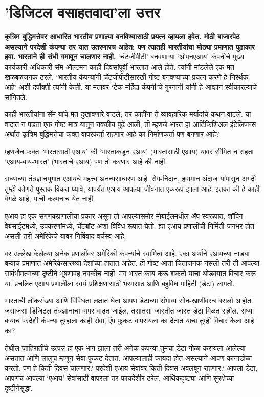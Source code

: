 \chapter{'डिजिटल वसाहतवादा'ला उत्तर }

{\textbf{कृत्रिम बुद्धिमत्तेवर आधारित भारतीय प्रणाल्या बनविण्यासाठी प्रयत्न व्हायला हवेत. मोठी बाजारपेठ असल्याने परदेशी कंपन्या तर यात उतरणारच आहेत; पण त्यातही भारतीयांचा मोठ्या प्रमाणात पुढाकार हवा. भारताने ही संधी गमावून चालणार नाही.}}
‘चॅटजीपीटी’ बनवणाऱ्या ‘ओपनएआय’ कंपनीचे मुख्य कार्यकारी अधिकारी सॅम ऑल्टमन काही दिवसांपूर्वी भारतात आले होते. त्यांनी मांडलेले एक मत खळबळजनक ठरले. ‘भारतीय कंपन्यांनी चॅटजीपीटीसारखी गोष्ट बनवण्याच्या प्रयत्न करणे हे निरर्थक आहे’ अशी दर्पोक्ती त्यांनी केली. या मतावर ‘टेक महिंद्रा कंपनी’चे गुरनानी यांनी हे आव्हान स्वीकारल्याचे सांगितले.

काही भारतीयांना सॅम यांचे मत दुखावणारे वाटले; तर काहींना ते व्यावहारिक मर्यादांचे कथन वाटले. या वादात न पडता एक गोष्ट मात्र यातून नक्कीच पुढे आली, ती म्हणजे भारत हा आर्टिफिशिअल इंटेलिजन्स अर्थात कृत्रिम बुद्धिमत्तेचा फक्त वापरकर्ता राहणार आहे का निर्माणकर्ता पण बनणार आहे?

म्हणजेच फक्त ‘भारतासाठी एआय’ की ‘भारताकडून एआय’ (भारतासाठी एआय) यावर सीमित न राहता ‘एआय-बाय-भारत’ (भारताचे एआय) पण तो करणार आहे की नाही.

सध्याच्या तंत्रज्ञानयुगात एआयचे महत्त्व अनन्यसाधारण आहे. रोग-निदान, हवामान अंदाज यांपासून अगदी तुम्ही कोणते पुस्तक विकत घ्यावे, यापर्यंत एआय आपल्या जीवनात एकरूप झाला आहे. इतका की हे काही वेगळे आहे, याची कल्पनाच येत नाही.

एआय हा एक संगणकप्रणालीचा प्रकार असून तो आपल्यासमोर मोबाईलमधील ॲप स्वरूपात, शॉपिंग वेबसाईटमध्ये, उपकरणांमध्ये, चॅटबॉट अशा विविध रूपात येतो. ह्या एआय प्रणालींची निर्मिती जगभर होत असली तरी अमेरिकेचे यावर निर्विवाद वर्चस्व आहे.

वर उल्लेख केलेल्या अनेक प्रणालींवर अमेरिकी कंपन्यांचे स्वामित्व आहे. एका अर्थाने एआयच्या नाड्या बऱ्याच प्रमाणात अमेरिकेसारख्या देशांच्या हातात आहेत. ही गोष्ट आता चिंताजनक नसली तरी ती आपल्या सार्वभौमत्वाच्या दृष्टीने भूषणावह नक्कीच नाही. मग भारत काय करू शकतो याचा थोडक्यात विचार करू या. प्रचलित एआय प्रणालीला स्वयं प्रशिक्षणासाठी भरमसाठ आणि बहुविध माहिती (डेटा) लागतो.

भारताची लोकसंख्या आणि विविधता लक्षात घेता आपण डेटाच्या संभाव्य सोन-खाणीवरच बसलो आहोत. जसाजसा डिजिटल तंत्रज्ञानाचा वापर वाढत जाईल, तसातसा जास्तीत जास्त डेटा मिळत राहील. सध्या बऱ्याच परदेशी कंपन्या तुम्हाला काही सेवा, ऍप फुकट वापरायला का देतात याचा तुम्ही विचार केला आहे का?

तेथील जाहिरातींचे उत्पन्न हा एक भाग झाला तरी अनेक कंपन्या तुमचा डेटा गोळा करायला आलेल्या असतात आणि लालूच म्हणून सेवा फुकट देतात. आपल्यालाही फायदा होत असल्याने आपण कानाडोळा करतो. पण हे किती दिवस चालणार? परदेशी एआय सेवांवर किती दिवस अवलंबून राहणार? आपला डेटा, आपणच आपल्या ‘एआय’ सेवांसाठी वापरला तर फायदेशीर ठरेल, आर्थिकदृष्ट्या आणि सुरक्षेच्या दृष्टीनेसुद्धा.

